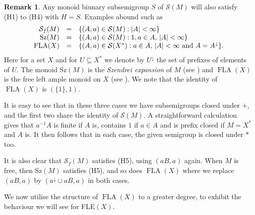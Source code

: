 \documentclass[12pt]{amsart}
\theoremstyle{definition}
\newtheorem{rem}[them]{Remark}
\theoremstyle{definition}
\numberwithin{them}{section}
\numberwithin{equation}{section}
\DeclareMathOperator{\FLA}{FLA}
\begin{document}
 \begin{rem}\label{rem:otherex} Any monoid biunary subsemigroup $S$ of $\mathcal{S}(M)$ will also satisfy (H1) to (H4) with $H=S$.  Examples abound such as 
\[\begin{array}{rcl}
\mathcal{S}_f(M)&=&\{ (A,a)\in \mathcal{S}(M):|A|<\infty\}\\
$Sz$(M)&=&\{ (A,a)\in \mathcal{S}(M): 1,a\in A,\, |A|<\infty\}\\
\FLA(X)&=&\{ (A,a)\in \mathcal{S}(X^*): a\in A,\, |A|<\infty \mbox{ and }A=A^{\downarrow}\}.\end{array}\]
Here for a set  $X$ and for $U\subseteq X^*$ we denote by $U^{\downarrow}$  the set of prefixes of elements of $U$. The monoid Sz$(M)$ is the {\em Szendrei expansion} of $M$ (see \cite{Sz}) and $\FLA(X)$ is the free left ample monoid on $X$ (see \cite{F3}). We note that the identity of 
 $\FLA(X)$ is $(\{ 1\},1)$. 

  It is easy to see that in these three cases  we have subsemigroups closed under $+$, and the first two share the identity of $\mathcal{S}(M)$. A straightforward calculation gives that  $a^{-1}A$ is finite if $A$ is, contains $1$ if $a\in A$ and is prefix closed if $M=X^*$ and $A$  is. It then follows that in each case,  the given semigroup is closed under $*$ too. 
  
  It is also clear that $\mathcal{S}_f(M)$ satisfies (H5), using $(aB,a)$ again.
When $M$ is free, 
then Sz$(M)$ satisfies (H5), and so does $\FLA(X)$ where  we replace  
$(aB,a)$  by $(a^{\downarrow}\cup aB,a)$ in both cases. 
\end{rem}

We now utilise the structure of $\FLA(X)$ to a greater degree, to exhibit the  behaviour we will see for  FLE$(X)$.
\end{document}
